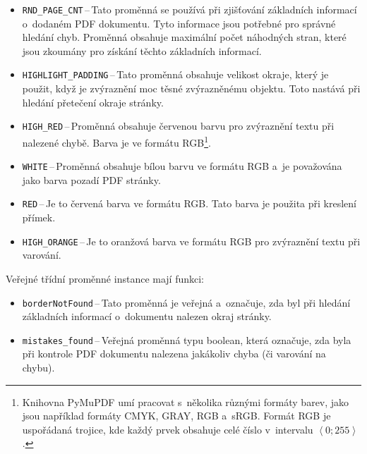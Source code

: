 \begin{itemize}
    \item \texttt{RND\_PAGE\_CNT}\,--\,Tato proměnná se používá při zjišťování
    základních informací o~dodaném PDF dokumentu. Tyto informace jsou potřebné
    pro správné hledání chyb. Proměnná obsahuje maximální počet náhodných stran,
    které jsou zkoumány pro získání těchto základních informací.

    \item \texttt{HIGHLIGHT\_PADDING}\,--\,Tato proměnná obsahuje velikost okraje,
    který je použit, když je zvýraznění moc těsné zvýrazněnému objektu. Toto
    nastává při hledání přetečení okraje stránky.

    \item \texttt{HIGH\_RED}\,--\,Proměnná obsahuje červenou barvu pro zvýraznění
    textu při nalezené chybě. Barva je ve formátu RGB\footnote{
        Knihovna PyMuPDF umí pracovat s~několika různými formáty barev, jako
        jsou například formáty CMYK, GRAY, RGB a~sRGB. 
        Formát RGB je uspořádaná trojice, kde každý prvek obsahuje celé číslo
        v~intervalu $\left\langle 0;255 \right\rangle$.
    }.

    \item \texttt{WHITE}\,--\,Proměnná obsahuje bílou barvu ve formátu RGB 
    a~je považována jako barva pozadí PDF stránky. 
    
    \item \texttt{RED}\,--\,Je to červená barva ve formátu RGB. Tato barva je
    použita při kreslení přímek.
    
    \item \texttt{HIGH\_ORANGE}\,--\,Je to oranžová barva ve formátu RGB pro
    zvýraznění textu při varování. 
\end{itemize}
Veřejné třídní proměnné instance mají funkci:
\begin{itemize}
    \item \texttt{borderNotFound}\,--\,Tato proměnná je veřejná a~označuje, zda byl
    při hledání základních informací o~dokumentu nalezen okraj stránky.

    \item \texttt{mistakes\_found}\,--\,Veřejná proměnná typu boolean, která označuje,
    zda byla při kontrole PDF dokumentu nalezena jakákoliv chyba (či varování
    na chybu).
\end{itemize}



